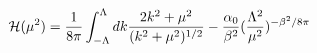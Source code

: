\begin{equation}
{\cal{H}}(\mu^2) = {1 \over 8 \pi} \int_{-\Lambda}^{\Lambda} dk
{2 k^2 + \mu^2 \over (k^2 + \mu^2)^{1/2} } - {\alpha_0 \over \beta^2}
 ( {\Lambda^2
\over \mu^2})^ {-\beta^2/ 8 \pi}
\end{equation}


